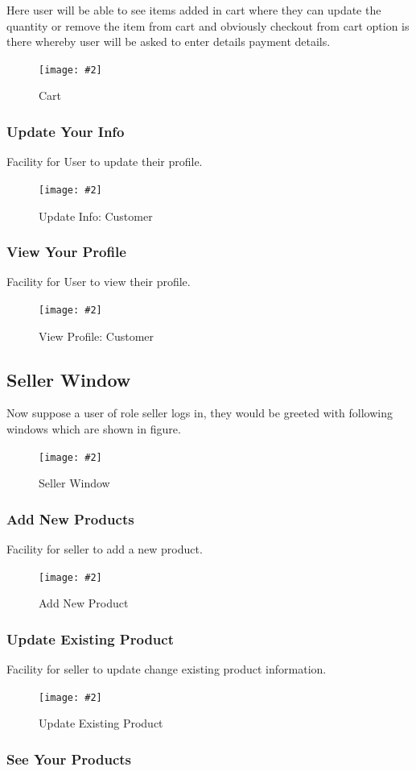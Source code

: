 \documentclass[a4paper,12pt]{article}
\newcommand{\iph}[2]{
    \texttt{[image: \#2]}
}
\newcommand{\dph}[3]{
\begin{figure}[H]
  \centering
  \iph{#1}{#2}
  \caption{#3}
\end{figure}
}
\begin{document}
Here user will be able to see items added in cart where they can update the quantity or remove the item from cart and obviously checkout from cart option is there whereby user will be asked to enter details payment details.

\dph{0.99}{cart}{Cart}

\subsubsection{Update Your Info}

Facility for User to update their profile.

\dph{0.99}{uppcust}{Update Info: Customer}

\subsubsection{View Your Profile}

Facility for User to view their profile.

\dph{0.79}{pcust}{View Profile: Customer}


\subsection{Seller Window}

Now suppose a user of role seller logs in, they would be greeted with following windows which are shown in figure.

\dph{0.66}{seller}{Seller Window}


\subsubsection{Add New Products}

Facility for seller to add a new product.

\dph{0.99}{newprod}{Add New Product}

\subsubsection{Update Existing Product}

Facility for seller to update change existing product information.

\dph{0.95}{mprod}{Update Existing Product}

\subsubsection{See Your Products}
\end{document}
